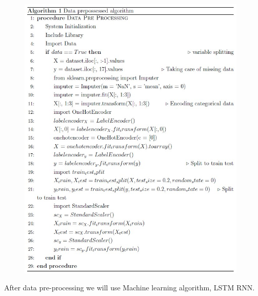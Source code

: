 \begin{figure}[H]
   \centering
   \includegraphics[width=4.3in]{Chap3/algorithm.png}
   
\end{figure}

After data pre-processing we will use Machine learning algorithm, LSTM RNN. 


